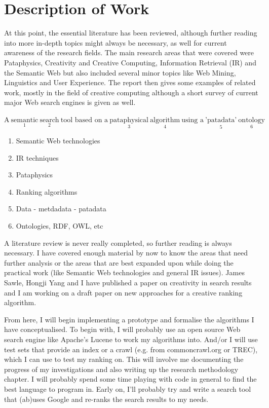 
\pagestyle{fancy}

\chapter{Description of Work}
\label{Description}

At this point, the essential literature has been reviewed, although further reading into more in-depth topics might always be necessary, as well for current awareness of the research fields. The main research areas that were covered were Pataphysics, Creativity and Creative Computing, Information Retrieval (IR) and the Semantic Web but also included several minor topics like Web Mining, Linguistics and User Experience. The report then gives some examples of related work, mostly in the field of creative computing although a short survey of current major Web search engines is given as well.

$\text{A} \ \underset{1}{\text{semantic}} \ \underset{2}{\text{search}} \ \text{tool based on a} \ \underset{3}{\text{pataphysical}} \ \underset{4}{\text{algorithm}} \ \text{using a} \ \underset{5}{\text{'patadata'}} \ \underset{6}{\text{ontology}}$

\begin{enumerate}
\item Semantic Web technologies
\item IR techniques
\item Pataphysics
\item Ranking algorithms
\item Data - metdadata - patadata
\item Ontologies, RDF, OWL, etc
\end{enumerate}

A literature review is never really completed, so further reading is always necessary. I have covered enough material by now to know the areas that need further analysis or the areas that are best expanded upon while doing the practical work (like Semantic Web technologies and general IR issues). James Sawle, Hongji Yang and I have published a paper on creativity in search results and I am working on a draft paper on new approaches for a creative ranking algorithm.

From here, I will begin implementing a prototype and formalise the algorithms I have conceptualised. To begin with, I will probably use an open source Web search engine like Apache's Lucene to work my algorithms into. And/or I will use test sets that provide an index or a crawl (e.g. from commoncrawl.org or TREC), which I can use to test my ranking on.  This will involve me documenting the progress of my investigations and also writing up the research methodology chapter. I will probably spend some time playing with code in general to find the best language to program in. Early on, I'll probably try and write a search tool that (ab)uses Google and re-ranks the search results to my needs.

